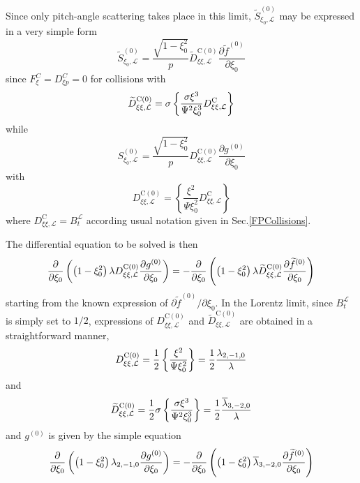 Since only pitch-angle scattering takes place in this limit, $\widetilde{S}
_{\xi _{0},\mathcal{L}}^{(0)}$ may be expressed in a very simple form
\begin{equation}
\widetilde{S}_{\xi _{0},\mathcal{L}}^{(0)}=\frac{\sqrt{1-\xi _{0}^{2}}}{p}%
\widetilde{D}_{\xi \xi ,\mathcal{L}}^{\text{C}(0)}\frac{\partial \widetilde{f%
}^{(0)}}{\partial \xi _{0}}
\end{equation}
since $F_{\xi }^{C}=D_{\xi p}^{C}=0$ for collisions with
\begin{equation}
\widetilde{D}_{\xi \xi ,\mathcal{L}}^{\text{C}(0)}=\sigma \left\{ \frac{%
\sigma \xi ^{3}}{\Psi ^{2}\xi _{0}^{3}}D_{\xi \xi ,\mathcal{L}}^{\text{C}
}\right\}
\end{equation}
while
\begin{equation}
S_{\xi _{0},\mathcal{L}}^{(0)}=\frac{\sqrt{1-\xi _{0}^{2}}}{p}D_{\xi \xi ,%
\mathcal{L}}^{\text{C}(0)}\frac{\partial g^{(0)}}{\partial \xi _{0}}
\end{equation}
with
\begin{equation}
D_{\xi \xi ,\mathcal{L}}^{\text{C}(0)}=\left\{ \frac{\xi ^{2}}{\Psi \xi
_{0}^{2}}D_{\xi \xi ,\mathcal{L}}^{\text{C}}\right\}
\end{equation}
where $D_{\xi \xi ,\mathcal{L}}^{\text{C}}=B_{t}^{\mathcal{L}}$ according
usual notation given in Sec.\ref{FPCollisions}.

The differential equation to be solved is then
\begin{equation}
\frac{\partial }{\partial \xi _{0}}\left( \left( 1-\xi _{0}^{2}\right)
\lambda D_{\xi \xi ,\mathcal{L}}^{\text{C}(0)}\frac{\partial g^{(0)}}{%
\partial \xi _{0}}\right) =-\frac{\partial }{\partial \xi _{0}}\left( \left(
1-\xi _{0}^{2}\right) \lambda \widetilde{D}_{\xi \xi ,\mathcal{L}}^{\text{C}
(0)}\frac{\partial \widetilde{f}^{(0)}}{\partial \xi _{0}}\right)
\end{equation}
starting from the known expression of $\partial \widetilde{f}^{(0)}/\partial
\xi _{0}.$ In the Lorentz limit, since $B_{t}^{\mathcal{L}}$ is simply set
to $1/2$, expressions of $D_{\xi \xi ,\mathcal{L}}^{\text{C}(0)}$ and $%
\widetilde{D}_{\xi \xi ,\mathcal{L}}^{\text{C}(0)}$ are obtained in a
straightforward manner,
\begin{equation}
D_{\xi \xi ,\mathcal{L}}^{\text{C}(0)}=\frac{1}{2}\left\{ \frac{\xi ^{2}}{%
\Psi \xi _{0}^{2}}\right\} =\frac{1}{2}\frac{\lambda _{2,-1,0}}{\lambda }
\end{equation}
and
\begin{equation}
\widetilde{D}_{\xi \xi ,\mathcal{L}}^{\text{C}(0)}=\frac{1}{2}\sigma \left\{
\frac{\sigma \xi ^{3}}{\Psi ^{2}\xi _{0}^{3}}\right\} =\frac{1}{2}\frac{%
\overline{\lambda }_{3,-2,0}}{\lambda }
\end{equation}
and $g^{(0)}$ is given by the simple equation
\begin{equation}
\frac{\partial }{\partial \xi _{0}}\left( \left( 1-\xi _{0}^{2}\right)
\lambda _{2,-1,0}\frac{\partial g^{(0)}}{\partial \xi _{0}}\right) =-\frac{%
\partial }{\partial \xi _{0}}\left( \left( 1-\xi _{0}^{2}\right) \overline{
\lambda }_{3,-2,0}\frac{\partial \widetilde{f}^{(0)}}{\partial \xi _{0}}
\right)
\end{equation}

